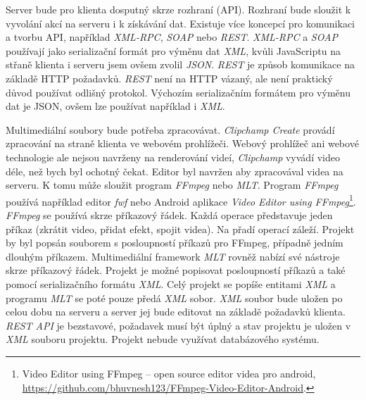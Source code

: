 Server bude pro klienta dosputný skrze rozhraní (API). Rozhraní bude sloužit k vyvolání akcí na serveru i k získávání dat. Existuje více koncepcí pro komunikaci a tvorbu API, například \textit{XML-RPC}, \textit{SOAP} nebo \textit{REST}. \textit{XML-RPC} a \textit{SOAP} používají jako serializační formát pro výměnu dat \textit{XML}, kvůli JavaScriptu na střaně klienta i serveru jsem ovšem zvolil \textit{JSON}. \textit{REST} je způsob komunikace na základě HTTP požadavků. \textit{REST} není na HTTP vázaný, ale není praktický důvod používat odlišný protokol. Výchozím serializačním formátem pro výměnu dat je JSON, ovšem lze používat například i \textit{XML}.

Multimediální soubory bude potřeba zpracovávat. \textit{Clipchamp Create} provádí zpracování na straně klienta ve webovém prohlížeči. Webový prohlížeč ani webové technologie ale nejsou navrženy na renderování videí, \textit{Clipchamp} vyvádí video déle, než bych byl ochotný čekat. Editor byl navržen aby zpracovával videa na serveru. K tomu může sloužit program \textit{FFmpeg} nebo \textit{MLT}. Program \textit{FFmpeg} používá například editor \textit{fwf} nebo Android aplikace \textit{Video Editor using FFmpeg}\footnote{Video Editor using FFmpeg -- open source editor videa pro android, \url{https://github.com/bhuvnesh123/FFmpeg-Video-Editor-Android}.}. \textit{FFmpeg} se používá skrze příkazový řádek. Každá operace představuje jeden příkaz (zkrátit video, přidat efekt, spojit videa). Na přadí operací záleží. Projekt by byl popsán souborem s posloupností příkazů pro FFmpeg, případně jedním dlouhým příkazem. Multimediální framework \textit{MLT} rovněž nabízí své nástroje skrze příkazový řádek. Projekt je možné popisovat posloupností příkazů a také pomocí serializačního formátu \textit{XML}. Celý projekt se popíše entitami \textit{XML} a programu \textit{MLT} se poté pouze předá \textit{XML} sobor. \textit{XML} soubor bude uložen po celou dobu na serveru a server jej bude editovat na základě požadavků klienta. \textit{REST API} je bezstavové, požadavek musí být úplný a stav projektu je uložen v \textit{XML} souboru projektu. Projekt nebude využívat databázového systému.


